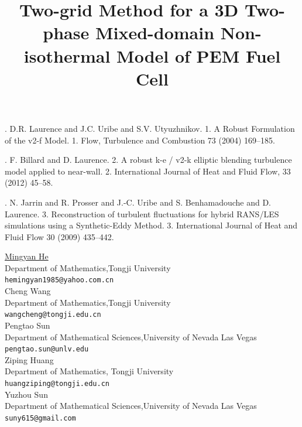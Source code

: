 \documentclass[article,A4,11pt]{llncs}%
\begin{document}

\begin{thebibliography}{10}
{. D.R. Laurence and J.C. Uribe and S.V. Utyuzhnikov}. {1. A Robust Formulation of the v2-f Model}. 1. Flow, Turbulence and Combustion 73 (2004) 169–185.

{. F. Billard and D. Laurence}. {2. A robust k-e / v2-k elliptic blending turbulence model applied to near-wall}. 2. International Journal of Heat and Fluid Flow, 33 (2012) 45–58.

{. N. Jarrin and R. Prosser and J.-C. Uribe and S. Benhamadouche and D. Laurence}. {3. Reconstruction of turbulent fluctuations for hybrid RANS/LES simulations using a Synthetic-Eddy Method}. 3.  International Journal of Heat and Fluid Flow 30 (2009) 435–442.
\end{thebibliography}

\title{Two-grid Method for a 3D Two-phase Mixed-domain Non-isothermal Model of PEM Fuel Cell}
 \author{} \institute{}
\maketitle
\begin{center}
{\large \underline{Mingyan He}}\\
Department of Mathematics,Tongji University\\
{\tt hemingyan1985@yahoo.com.cn}
\\ \vspace{4mm}
{\large Cheng Wang}\\
Department of Mathematics,Tongji University\\
{\tt wangcheng@tongji.edu.cn}
\\ \vspace{4mm}
{\large Pengtao Sun}\\
Department of Mathematical Sciences,University of Nevada Las Vegas\\
{\tt pengtao.sun@unlv.edu}
\\ \vspace{4mm}
{\large Ziping Huang}\\
Department of Mathematics, Tongji University\\
{\tt huangziping@tongji.edu.cn}
\\ \vspace{4mm}
{\large Yuzhou Sun}\\
Department of Mathematical Sciences,University of Nevada Las Vegas\\
{\tt suny615@gmail.com}
\end{center}
\end{document}
